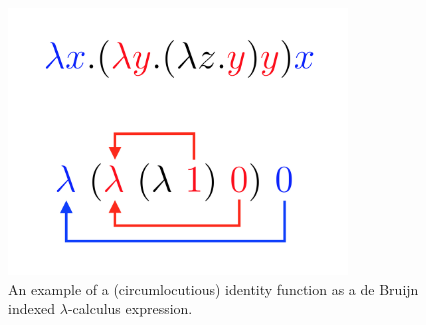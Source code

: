 \begin{figure}[h]

%

\centering
\includegraphics[width=9cm]{Figures/DeBruijnIndex}

\caption{An example of a (circumlocutious) identity function as a de Bruijn indexed $\lambda$-calculus expression.}
\label{fig:db_example}
\end{figure}
